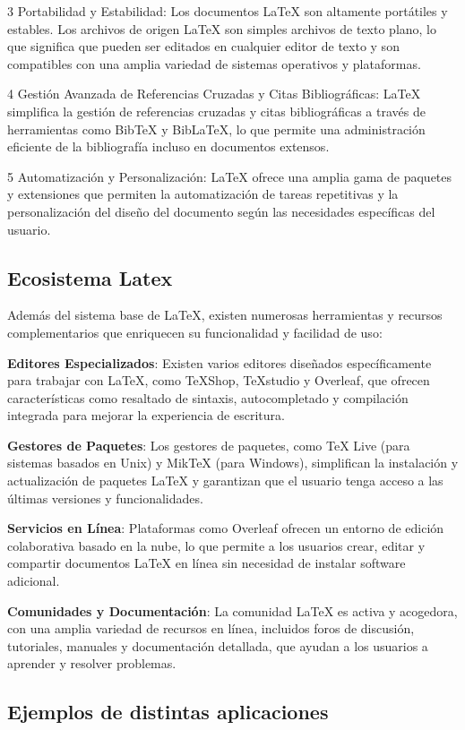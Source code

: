 \documentclass{article}
\begin{document}
3 Portabilidad y Estabilidad: Los documentos LaTeX son altamente portátiles y estables. Los archivos de origen LaTeX son simples archivos de texto plano, lo que significa que pueden ser editados en cualquier editor de texto y son compatibles con una amplia variedad de sistemas operativos y plataformas.

4 Gestión Avanzada de Referencias Cruzadas y Citas Bibliográficas: LaTeX simplifica la gestión de referencias cruzadas y citas bibliográficas a través de herramientas como BibTeX y BibLaTeX, lo que permite una administración eficiente de la bibliografía incluso en documentos extensos.

5 Automatización y Personalización: LaTeX ofrece una amplia gama de paquetes y extensiones que permiten la automatización de tareas repetitivas y la personalización del diseño del documento según las necesidades específicas del usuario.
\subsection{Ecosistema Latex}
Además del sistema base de LaTeX, existen numerosas herramientas y recursos complementarios que enriquecen su funcionalidad y facilidad de uso:

\textbf{Editores Especializados}: Existen varios editores diseñados específicamente para trabajar con LaTeX, como TeXShop, TeXstudio y Overleaf, que ofrecen características como resaltado de sintaxis, autocompletado y compilación integrada para mejorar la experiencia de escritura.

\textbf{Gestores de Paquetes}: Los gestores de paquetes, como TeX Live (para sistemas basados en Unix) y MikTeX (para Windows), simplifican la instalación y actualización de paquetes LaTeX y garantizan que el usuario tenga acceso a las últimas versiones y funcionalidades.

\textbf{Servicios en Línea}: Plataformas como Overleaf ofrecen un entorno de edición colaborativa basado en la nube, lo que permite a los usuarios crear, editar y compartir documentos LaTeX en línea sin necesidad de instalar software adicional.

\textbf{Comunidades y Documentación}: La comunidad LaTeX es activa y acogedora, con una amplia variedad de recursos en línea, incluidos foros de discusión, tutoriales, manuales y documentación detallada, que ayudan a los usuarios a aprender y resolver problemas.
\subsection{Ejemplos de distintas aplicaciones}
\end{document}
